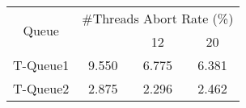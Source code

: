 \begin{tabular}{|c|c|c|c|}
\hline
\multirow{2}{*}{Queue} & \multicolumn{3}{c|}{\#Threads Abort Rate (\%)}\\\cline{2-4}& \quad 4 & 12 & 20\\
\hline
\hline
T-Queue1 & 9.550 & 6.775 & 6.381\\
T-Queue2 & 2.875 & 2.296 & 2.462\\
\hline\end{tabular}
